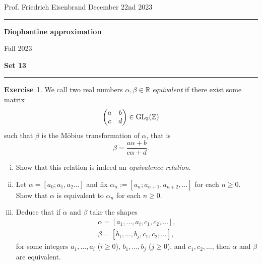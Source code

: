 \documentclass[12pt,a4paper]{article}
\date{}
\theoremstyle{plain}
\newtheorem*{Sol*}{Solution}
\theoremstyle{definition}
\newtheorem{Ex}{Exercise}
\def \R {\mathbb R}
\def \Z {\mathbb Z}
\newif\ifsolutions
\newcommand{\exercise}[2]{
			\begin{Ex} #1 \end{Ex}
			\ifsolutions  \begin{Sol*} #2 \end{Sol*} \bigskip \else \bigskip  \fi
		}
\begin{document}
\begin{center}
{Prof. Friedrich Eisenbrand \hfill December 22nd 2023}
\end{center}
	
\hrule\vspace{\baselineskip}

\begin{center}
\textbf{Diophantine approximation}

Fall 2023

\bigskip

\textbf{Set 13}
\ifsolutions{\textbf{- Solutions}} \else{} \fi
\end{center}

\hrule\vspace{\baselineskip}




\exercise{\label{ex:1}
	We call two real numbers $\alpha, \beta \in \R$ \emph{equivalent} if there exist some matrix
		\[ \begin{pmatrix} a & b \\ c & d \end{pmatrix} \in {\rm GL}_2(\Z) \]
	such that $\beta$ is the Möbius transformation of $\alpha$, that is
		\[ \beta = \frac{a \alpha + b}{c \alpha + d}. \]
	
	\begin{enumerate}[i)]
		\item Show that this relation is indeed an \emph{equivalence relation}.
		\item Let $\alpha = [a_0;a_1, a_2 \dots]$ and fix $\alpha_n := [a_n; a_{n+1}, a_{n+2}, \dots]$ for each $n \geq 0$.
		Show that $\alpha$ is equivalent to $\alpha_n$ for each $n \geq 0$.

		\item Deduce that if $\alpha$ and $\beta$ take the shapes
			\begin{gather*}
				\alpha = [a_1, \dots, a_i, c_1, c_2, \dots], \\
				\beta = [b_1, \dots, b_j, c_1, c_2, \dots],
			\end{gather*}
		for some integers $a_1, \dots, a_i$ ($i \geq 0$), $b_1, \dots, b_j$ ($j\geq0$), and $c_1, c_2, \dots$,
		then $\alpha$ and $\beta$ are equivalent.
	\end{enumerate}
}
{}
\end{document}
